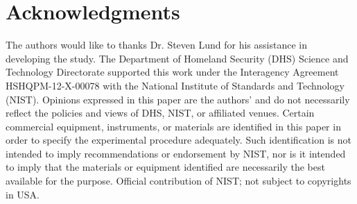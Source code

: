 \documentclass[fleqn,10pt,lineno]{wlpeerj}\usepackage[]{graphicx}\usepackage[]{color}
\begin{document}
\newpage

\section*{Acknowledgments}

The authors would like to thanks Dr. Steven Lund for his assistance in developing the study. 
The Department of Homeland Security (DHS) Science and Technology Directorate supported this work under the Interagency Agreement HSHQPM-12-X-00078 with the National Institute of Standards and Technology (NIST). 
Opinions expressed in this paper are the authors’ and do not necessarily reflect the policies and views of DHS,  NIST, or affiliated venues. 
Certain commercial equipment, instruments, or materials are identified in this paper in order to specify the experimental procedure adequately. 
Such identification is not intended to imply recommendations or endorsement by NIST, 
nor is it intended to imply that the materials or equipment identified are necessarily the best available for the purpose. 
Official contribution of NIST; not subject to copyrights in USA.


\end{document}
